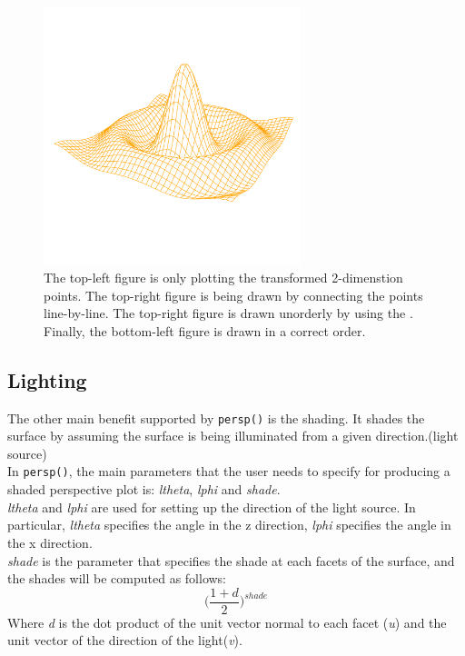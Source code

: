 \documentclass[paper=a4, fontsize=11pt]{report}
\begin{document}
\begin{figure}[h]
\begin{center}
  \includegraphics[height = 7.5cm, width = 7.5cm]{figure/standalone_p_4.pdf}
  \caption{The top-left figure is only plotting the transformed 2-dimenstion points. The top-right figure is being drawn by connecting the points line-by-line. The top-right figure is drawn unorderly by using the . Finally, the bottom-left figure is drawn in a correct order.}
  	\label{figure4}
\end{center}
\end{figure}

\subsection{Lighting}
The other main benefit supported by \texttt{persp()} is the shading. It shades the surface by assuming the surface is being illuminated from a given direction.(light source)\\

In \texttt{persp()}, the main parameters that the user needs to specify for producing a shaded perspective plot is: \textit{ltheta}, \textit{lphi} and \textit{shade}.\\

\textit{ltheta} and \textit{lphi} are used for setting up the direction of the light source. In particular, \textit{ltheta} specifies the angle in the z direction, \textit{lphi} specifies the angle in the x direction. \\

\textit{shade} is the parameter that specifies the shade at each facets of the surface, and the shades will be computed as follows:
\begin{equation}
\big(\frac{1 + d}{2}\big)^{shade}
\end{equation}
Where \textit{d} is the dot product of the unit vector normal to each facet (\textit{u}) and the unit vector of the direction of the light(\textit{v}). \\
\end{document}
